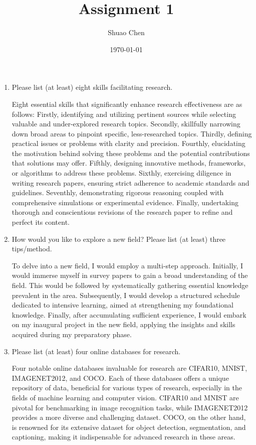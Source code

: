 \documentclass[12pt]{article}
\title{Assignment 1}
\author{Shuao Chen}
\date{\today}
\begin{document}
\maketitle
\begin{enumerate}
    \item Please list (at least) eight skills facilitating research.
    
       Eight essential skills that significantly enhance research effectiveness are as follows: Firstly, identifying and utilizing pertinent sources while selecting valuable and under-explored research topics. Secondly, skillfully narrowing down broad areas to pinpoint specific, less-researched topics. Thirdly, defining practical issues or problems with clarity and precision. Fourthly, elucidating the motivation behind solving these problems and the potential contributions that solutions may offer. Fifthly, designing innovative methods, frameworks, or algorithms to address these problems. Sixthly, exercising diligence in writing research papers, ensuring strict adherence to academic standards and guidelines. Seventhly, demonstrating rigorous reasoning coupled with comprehensive simulations or experimental evidence. Finally, undertaking thorough and conscientious revisions of the research paper to refine and perfect its content.

    \item How would you like to explore a new field? Please list (at least) three tips/method.
    
       To delve into a new field, I would employ a multi-step approach. Initially, I would immerse myself in survey papers to gain a broad understanding of the field. This would be followed by systematically gathering essential knowledge prevalent in the area. Subsequently, I would develop a structured schedule dedicated to intensive learning, aimed at strengthening my foundational knowledge. Finally, after accumulating sufficient experience, I would embark on my inaugural project in the new field, applying the insights and skills acquired during my preparatory phase.

    \item Please list (at least) four online databases for research.
    
       Four notable online databases invaluable for research are CIFAR10, MNIST, IMAGENET2012, and COCO. Each of these databases offers a unique repository of data, beneficial for various types of research, especially in the fields of machine learning and computer vision. CIFAR10 and MNIST are pivotal for benchmarking in image recognition tasks, while IMAGENET2012 provides a more diverse and challenging dataset. COCO, on the other hand, is renowned for its extensive dataset for object detection, segmentation, and captioning, making it indispensable for advanced research in these areas.


\end{enumerate}
\end{document}
